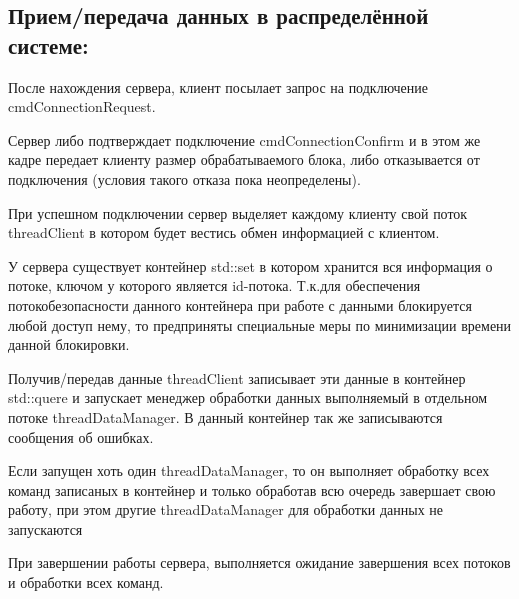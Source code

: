 \subsection*{Прием/передача данных в распределённой системе\+:}


\begin{DoxyItemize}
\item После нахождения сервера, клиент посылает запрос на подключение cmd\+Connection\+Request.
\item Сервер либо подтверждает подключение cmd\+Connection\+Confirm и в этом же кадре передает клиенту размер обрабатываемого блока, либо отказывается от подключения (условия такого отказа пока неопределены).
\item При успешном подключении сервер выделяет каждому клиенту свой поток thread\+Client в котором будет вестись обмен информацией с клиентом.
\item У сервера существует контейнер std\+::set в котором хранится вся информация о потоке, ключом у которого является id-\/потока. Т.\+к.\+для обеспечения потокобезопасности данного контейнера при работе с данными блокируется любой доступ нему, то предприняты специальные меры по минимизации времени данной блокировки.
\item Получив/передав данные thread\+Client записывает эти данные в контейнер std\+::quere и запускает менеджер обработки данных выполняемый в отдельном потоке thread\+Data\+Manager. В данный контейнер так же записываются сообщения об ошибках.
\item Если запущен хоть один thread\+Data\+Manager, то он выполняет обработку всех команд записаных в контейнер и только обработав всю очередь завершает свою работу, при этом другие thread\+Data\+Manager для обработки данных не запускаются
\item При завершении работы сервера, выполняется ожидание завершения всех потоков и обработки всех команд. 
\end{DoxyItemize}